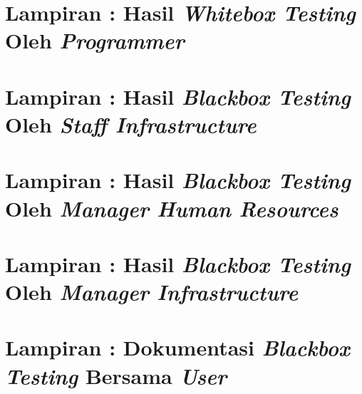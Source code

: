 \nextappendix
\section*{Lampiran \theappendixletter: Hasil \textit{Whitebox Testing} Oleh \textit{Programmer}
\label{sec:whitebox-testing-aplikasi-presensi-online-oleh-programmer}}

\pagebreak

\nextappendix
\section*{Lampiran \theappendixletter: Hasil \textit{Blackbox Testing} Oleh \textit{Staff Infrastructure}
\label{sec:blackbox-testing-aplikasi-presensi-online-oleh-staff-infrastructure}}

\pagebreak

\nextappendix
\section*{Lampiran \theappendixletter: Hasil \textit{Blackbox Testing} Oleh \textit{Manager Human Resources}
\label{sec:blackbox-testing-aplikasi-presensi-online-oleh-manager-hrd}}

\pagebreak

\nextappendix
\section*{Lampiran \theappendixletter: Hasil \textit{Blackbox Testing} Oleh \textit{Manager Infrastructure}
\label{sec:blackbox-testing-aplikasi-presensi-online-oleh-manager-infrastructure}}

\pagebreak

\nextappendix
\section*{Lampiran \theappendixletter: Dokumentasi \textit{Blackbox Testing} Bersama \textit{User}
\label{sec:dokumentasi-blackbox-testing}}

\pagebreak

